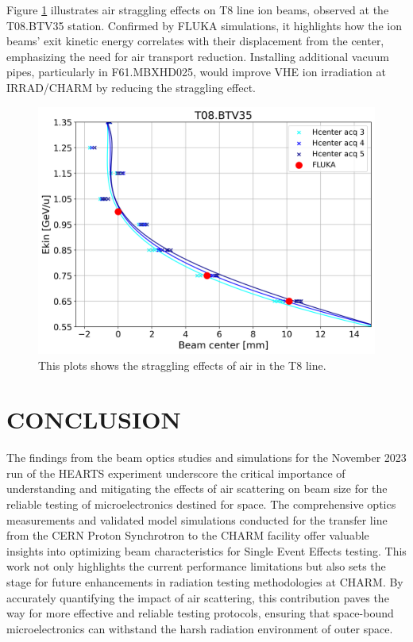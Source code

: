 \documentclass[a4paper,
               biblatex,     %
               ]{jacow}
\begin{document}
Figure \ref{fig:straggling_effects} illustrates air straggling effects on T8 line ion beams, observed at the T08.BTV35 station. Confirmed by FLUKA simulations, it highlights how the ion beams' exit kinetic energy correlates with their displacement from the center, emphasizing the need for air transport reduction. Installing additional vacuum pipes, particularly in F61.MBXHD025, would improve VHE ion irradiation at IRRAD/CHARM by reducing the straggling effect.
\begin{figure}[!htb]
   \centering
   \includegraphics*[width=1.0\columnwidth]{straggling_effects.png}
   \caption{This plots shows the straggling effects of air in the T8 line.}
   \label{fig:straggling_effects}
\end{figure}



\section{CONCLUSION}

The findings from the beam optics studies and simulations for the November 2023 run of the HEARTS experiment underscore the critical importance of understanding and mitigating the effects of air scattering on beam size for the reliable testing of microelectronics destined for space. The comprehensive optics measurements and validated model simulations conducted for the transfer line from the CERN Proton Synchrotron to the CHARM facility offer valuable insights into optimizing beam characteristics for Single Event Effects testing. This work not only highlights the current performance limitations but also sets the stage for future enhancements in radiation testing methodologies at CHARM. By accurately quantifying the impact of air scattering, this contribution paves the way for more effective and reliable testing protocols, ensuring that space-bound microelectronics can withstand the harsh radiation environment of outer space.
\end{document}
